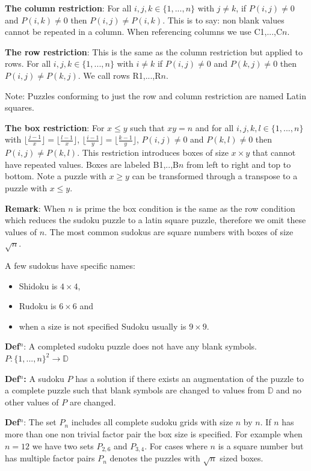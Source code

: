 \documentclass[a4paper,11pt]{report}
\newcounter{row}
\newcounter{col}
\begin{document}
\textbf{The column restriction}: For all $i,j,k\in \{1,...,n\}$ with $j\neq k$, if $P(i,j)\neq0$ and $P(i,k)\neq0$ then $P(i,j)\neq P(i,k)$. This is to say: non blank values cannot be repeated in a column. When referencing columns we use C1,...,C$n$.

\textbf{The row restriction}: This is the same as the column restriction but applied to rows. For all $i,j,k\in \{1,...,n\}$ with $i\neq k$ if $P(i,j)\neq0$ and $P(k,j)\neq0$ then $P(i,j)\neq P(k,j)$. We call rows R1,...,R$n$.

Note: Puzzles conforming to just the row and column restriction are named Latin squares. 

\textbf{The box restriction}: For $x\leq y$ such that $xy=n$ and for all $i,j,k,l\in\{1,...,n\}$ with $\lfloor \frac{j-1}{x} \rfloor=\lfloor \frac{l-1}{x}\rfloor$, $\lfloor \frac{i-1}{y} \rfloor=\lfloor \frac{k-1}{y}\rfloor$, $P(i,j)\neq0$ and $P(k,l)\neq0$ then $P(i,j)\neq P(k,l)$. This restriction introduces boxes of size $x\times y$ that cannot have repeated values. Boxes are labeled B1,..,B$n$ from left to right and top to bottom. Note a puzzle with $x\geq y$ can be transformed through a transpose to a puzzle with $x\leq y$. 

\textbf{Remark}: When $n$ is prime the box condition is the same as the row condition which reduces the sudoku puzzle to a latin square puzzle, therefore we omit these values of $n$. The most common sudokus are square numbers with boxes of size $\sqrt{n}$. 

A few sudokus have specific names:
\begin{itemize}
\item Shidoku is $4\times 4$,
\item Rudoku is $6\times 6$ and
\item when a size is not specified Sudoku usually is $9\times 9$.
\end{itemize} 

\textbf{Def$^n$}: A completed sudoku puzzle does not have any blank symbols. $P:  \{1,...,n\}^2\rightarrow\mathbb D$ 

\textbf{Def$^n$:} A sudoku $P$ has a solution if there exists an augmentation of the puzzle to a complete puzzle such that blank symbols are changed to values from $\mathbb D$ and no other values of $P$ are changed.

\textbf{Def$^n$}: The set $P_n$ includes all complete sudoku grids with size $n$ by $n$. If $n$ has more than one non trivial factor pair the box size is specified. For example when $n=12$ we have two sets $P_{2,6}$ and $P_{3,4}$. For cases where $n$ is a square number but has multiple factor pairs $P_n$ denotes the puzzles with $\sqrt{n}$ sized boxes.
\end{document}

